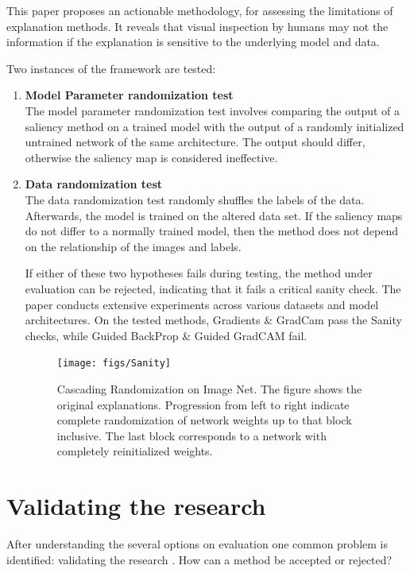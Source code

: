 This paper proposes an actionable methodology, for assessing the limitations of explanation methods. It reveals that visual inspection by humans may not the information if the explanation is sensitive to the underlying model and data.

Two instances of the framework are tested:

\begin{enumerate}
	\item \textbf{Model Parameter randomization test}\\
		The model parameter randomization test involves comparing the output of a saliency method on a trained model with the output of a randomly initialized untrained network of the same architecture. The output should differ, otherwise the saliency map is considered ineffective.
	\item \textbf{Data randomization test}\\
		The data randomization test randomly shuffles the labels of the data. Afterwards, the model is trained on the altered data set. If the saliency maps do not differ to a normally trained model, then the method does not depend on the relationship of the images and labels.

If either of these two hypotheses fails during testing, the method under evaluation can be rejected, indicating that it fails a critical sanity check. The paper conducts extensive experiments across various datasets and model architectures. On the tested methods, Gradients \& GradCam pass the Sanity checks, while Guided BackProp \& Guided GradCAM fail.

\begin{figure}[h!]
	\centering
	\texttt{[image: figs/Sanity]}
	\caption[Cascading Randomization on Image Net.]{Cascading Randomization on Image Net. The figure shows the original explanations. Progression from left to right indicate complete randomization of network weights up to that block inclusive. The last block corresponds to a network with completely reinitialized weights. \cite{adebayo2020sanity}}
	\label{fig:Sanity}
\end{figure}

\end{enumerate}


\section{Validating the research}

After understanding the several options on evaluation one common problem is identified: validating the research \cite{allen2023interpretable}. How can a method be accepted or rejected?

